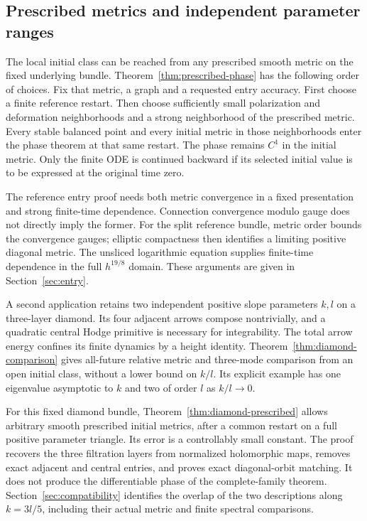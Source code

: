 \documentclass[11pt]{amsart}
\theoremstyle{definition}
\theoremstyle{remark}
\begin{document}
\subsection{Prescribed metrics and independent parameter ranges}
The local initial class can be reached from any prescribed smooth
metric on the fixed underlying bundle. Theorem~\ref{thm:prescribed-phase}
has the following order of choices. Fix that metric, a graph and
a requested entry accuracy. First choose a finite reference
restart. Then choose sufficiently small polarization and
deformation neighborhoods and a strong neighborhood of the
prescribed metric. Every stable balanced point and every initial
metric in those neighborhoods enter the phase theorem at that
same restart. The phase remains $C^1$ in the initial metric.
Only the finite ODE is continued backward if its selected initial
value is to be expressed at the original time zero.

The reference entry proof needs both metric convergence in a
fixed presentation and strong finite-time dependence. Connection
convergence modulo gauge does not directly imply the former.
For the split reference bundle, metric order bounds the convergence
gauges; elliptic compactness then identifies a limiting positive
diagonal metric. The unsliced logarithmic equation supplies
finite-time dependence in the full $h^{19/8}$ domain. These
arguments are given in Section~\ref{sec:entry}.

A second application retains two independent positive slope
parameters $k,l$ on a three-layer diamond. Its four adjacent
arrows compose nontrivially, and a quadratic central Hodge
primitive is necessary for integrability. The total arrow
energy confines its finite dynamics by a height identity.
Theorem~\ref{thm:diamond-comparison} gives all-future relative
metric and three-mode comparison from an open initial class,
without a lower bound on $k/l$. Its explicit example has one
eigenvalue asymptotic to $k$ and two of order $l$ as $k/l\to0$.

For this fixed diamond bundle,
Theorem~\ref{thm:diamond-prescribed} allows arbitrary smooth
prescribed initial metrics, after a common restart on a full
positive parameter triangle. Its error is a controllably small
constant. The proof recovers the three filtration layers from
normalized holomorphic maps, removes exact adjacent and central
entries, and proves exact diagonal-orbit matching. It does not
produce the differentiable phase of the complete-family theorem.
Section~\ref{sec:compatibility} identifies the overlap of the
two descriptions along $k=3l/5$, including their actual metric
and finite spectral comparisons.
\end{document}
